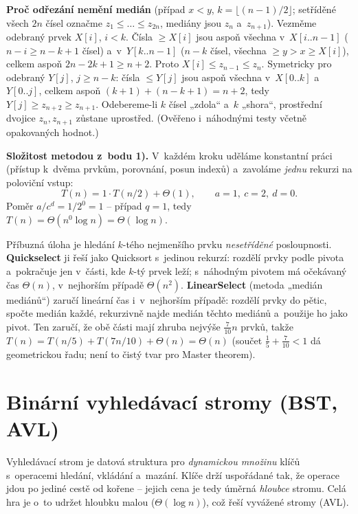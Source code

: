 \documentclass[11pt,a4paper]{article}
\begin{document}
\begin{priklad}
\textbf{Proč odřezání nemění medián} (případ $x<y$, $k=\lfloor(n-1)/2\rfloor$; setříděné všech $2n$ čísel označme $z_1\le\dots\le z_{2n}$, mediány jsou $z_n$ a~$z_{n+1}$). Vezměme odebraný prvek $X[i]$, $i<k$. Čísla $\ge X[i]$ jsou aspoň všechna v~$X[i..n{-}1]$ ($n-i\ge n-k+1$ čísel) a~v~$Y[k..n{-}1]$ ($n-k$ čísel, všechna $\ge y>x\ge X[i]$), celkem aspoň $2n-2k+1\ge n+2$. Proto $X[i]\le z_{n-1}\le z_n$. Symetricky pro odebraný $Y[j]$, $j\ge n-k$: čísla $\le Y[j]$ jsou aspoň všechna v~$X[0..k]$ a~$Y[0..j]$, celkem aspoň $(k+1)+(n-k+1)=n+2$, tedy $Y[j]\ge z_{n+2}\ge z_{n+1}$. Odebereme-li $k$ čísel „zdola`` a~$k$ „shora``, prostřední dvojice $z_n,z_{n+1}$ zůstane uprostřed. (Ověřeno i~náhodnými testy včetně opakovaných hodnot.)

\textbf{Složitost metodou z~bodu 1).} V~každém kroku uděláme konstantní práci (přístup k~dvěma prvkům, porovnání, posun indexů) a~zavoláme \emph{jednu} rekurzi na poloviční vstup:
\[
T(n)=1\cdot T(n/2)+\Theta(1),\qquad a=1,\ c=2,\ d=0.
\]
Poměr $a/c^{d}=1/2^0=1$ -- případ $q=1$, tedy $T(n)=\Theta(n^0\log n)=\boxed{\Theta(\log n)}$.
\end{priklad}

\begin{poznamka}
Příbuzná úloha je hledání $k$-tého nejmenšího prvku \emph{nesetříděné} posloupnosti. \textbf{Quickselect} ji řeší jako Quicksort s~jedinou rekurzí: rozdělí prvky podle pivota a~pokračuje jen v~části, kde $k$-tý prvek leží; s~náhodným pivotem má očekávaný čas $\Theta(n)$, v~nejhorším případě $\Theta(n^2)$. \textbf{LinearSelect} (metoda „medián mediánů``) zaručí lineární čas i~v~nejhorším případě: rozdělí prvky do pětic, spočte medián každé, rekurzivně najde medián těchto mediánů a~použije ho jako pivot. Ten zaručí, že obě části mají zhruba nejvýše $\tfrac{7}{10}n$ prvků, takže $T(n)=T(n/5)+T(7n/10)+\Theta(n)=\Theta(n)$ (součet $\tfrac15+\tfrac{7}{10}<1$ dá geometrickou řadu; není to čistý tvar pro Master theorem).
\end{poznamka}

\section{Binární vyhledávací stromy (BST, AVL)}

Vyhledávací strom je datová struktura pro \emph{dynamickou množinu} klíčů s~operacemi hledání, vkládání a~mazání. Klíče drží uspořádané tak, že operace jdou po jediné cestě od kořene -- jejich cena je tedy úměrná \emph{hloubce} stromu. Celá hra je o~to udržet hloubku malou ($\Theta(\log n)$), což řeší vyvážené stromy (AVL).
\end{document}
